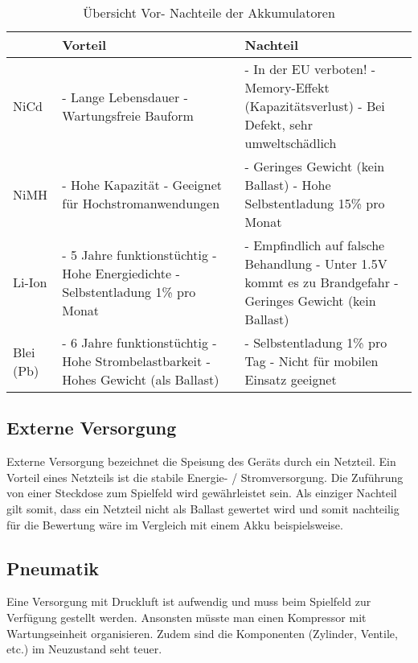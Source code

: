 \begin{table}[h!]
	\begin{tabular}{|p{1cm}|p{5cm}|p{6cm}|} \hline
		          &\textbf{Vorteil}  & \textbf{Nachteil}\tabularnewline \hline
		NiCd      &  - Lange Lebensdauer \newline - Wartungsfreie Bauform & - In der EU verboten! \newline -  Memory-Effekt (Kapazitätsverlust) \newline - Bei Defekt, sehr umweltschädlich \tabularnewline \hline
		NiMH      & - Hohe Kapazität \newline - Geeignet für Hochstromanwendungen  & - Geringes Gewicht (kein Ballast) \newline - Hohe Selbstentladung 15\% pro Monat \tabularnewline \hline
		Li-Ion    & - 5 Jahre funktionstüchtig \newline - Hohe Energiedichte \newline - Selbstentladung 1\% pro Monat & - Empfindlich auf falsche Behandlung \newline - Unter 1.5V kommt es zu Brandgefahr \newline - Geringes Gewicht (kein Ballast) \tabularnewline \hline
		Blei (Pb) & - 6 Jahre funktionstüchtig \newline - Hohe Strombelastbarkeit \newline - Hohes Gewicht (als Ballast)  & - Selbstentladung 1\% pro Tag \newline - Nicht für mobilen Einsatz geeignet  \tabularnewline \hline
	\end{tabular}
	\centering
	\caption{Übersicht Vor- Nachteile der Akkumulatoren}
	\label{tab:UebersichtVorNachTeil} 
\end{table}

\subsection{Externe Versorgung}
Externe Versorgung bezeichnet die Speisung des Geräts durch ein Netzteil. Ein Vorteil eines Netzteils ist die stabile Energie- / Stromversorgung. Die Zuführung von einer Steckdose zum Spielfeld wird gewährleistet sein. Als einziger Nachteil gilt somit, dass ein Netzteil nicht als Ballast gewertet wird und somit nachteilig für die Bewertung wäre im Vergleich mit einem Akku beispielsweise.

\subsection{Pneumatik}
Eine Versorgung mit Druckluft ist aufwendig und muss beim Spielfeld zur Verfügung gestellt werden. Ansonsten müsste man einen Kompressor mit Wartungseinheit organisieren. Zudem sind die Komponenten (Zylinder, Ventile, etc.) im Neuzustand seht teuer.

